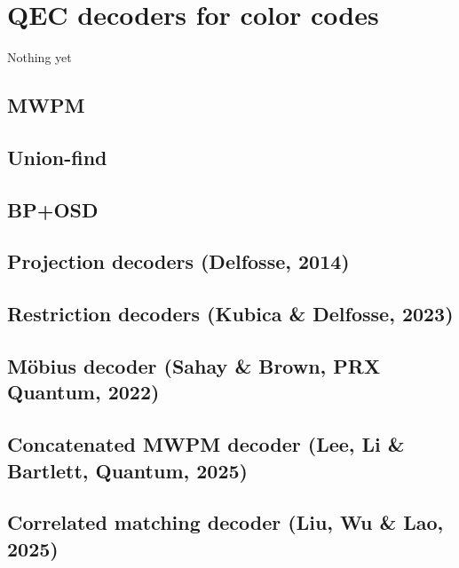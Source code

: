 \chapter{QEC decoders for color codes}
Nothing yet
\section{MWPM}

\section{Union-find}

\section{BP+OSD}

\section{Projection decoders (Delfosse, 2014)}

\section{Restriction decoders (Kubica \& Delfosse, 2023)}

\section{Möbius decoder (Sahay \& Brown, PRX Quantum, 2022)}

\section{Concatenated MWPM decoder (Lee, Li \& Bartlett, Quantum, 2025)}

\section{Correlated matching decoder (Liu, Wu \& Lao, 2025)}
